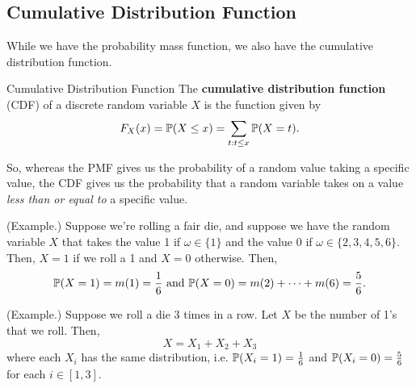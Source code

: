 \subsection{Cumulative Distribution Function}
While we have the probability mass function, we also have the cumulative distribution function.
\begin{definition}{Cumulative Distribution Function}{}
    The \textbf{cumulative distribution function} (CDF) of a discrete random variable $X$ is the function given by 
    \[F_{X}(x) = \mathbb{P}(X \leq x) = \sum_{t : t \leq x} \mathbb{P}(X = t).\]
\end{definition}
So, whereas the PMF gives us the probability of a random value taking a specific value, the CDF gives us the probability that a random variable takes on a value \emph{less than or equal to} a specific value.  

\begin{mdframed}[]
    (Example.) Suppose we're rolling a fair die, and suppose we have the random variable $X$ that takes the value 1 if $\omega \in \{1\}$ and the value 0 if $\omega \in \{2, 3, 4, 5, 6\}$. Then, $X = 1$ if we roll a 1 and $X = 0$ otherwise. Then,
    \[\mathbb{P}(X = 1) = m(1) = \frac{1}{6} \text{ and } \mathbb{P}(X = 0) = m(2) + \dots + m(6) = \frac{5}{6}.\]
\end{mdframed}

\begin{mdframed}[]
    (Example.) Suppose we roll a die 3 times in a row. Let $X$ be the number of 1's that we roll. Then, 
    \[X = X_1 + X_2 + X_3\]
    where each $X_i$ has the same distribution, i.e. $\mathbb{P}(X_i = 1) = \frac{1}{6}$ and $\mathbb{P}(X_i = 0) = \frac{5}{6}$ for each $i \in [1, 3]$. 
\end{mdframed}

